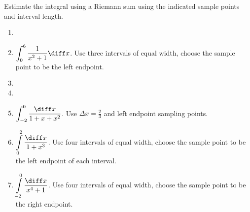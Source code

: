 Estimate the integral using a Riemann sum using the indicated sample points and interval length.
\begin{enumerate}[ref={\fcProblemRef}]
\item 
\item $\displaystyle \int_0^6 \frac{1}{x^2+1} \diff x$. Use three intervals of equal width, choose the sample point to be the left endpoint. 

\item 
\item 
\item $\displaystyle\int_{-2}^{0} \frac{\diff x}{1+x+x^2}$. Use $\Delta x=\frac23 $ and left endpoint sampling points.


\item $\displaystyle \int\limits_0^2 \frac{\diff x}{1+x^3}$. Use four intervals of equal width, choose the sample point to be the left endpoint of each interval. 


\item $\displaystyle \int\limits_{-2}^{0} \frac{\diff x}{x^4+1} $. Use four intervals of equal width, choose the sample point to be the right endpoint. 


\end{enumerate}



